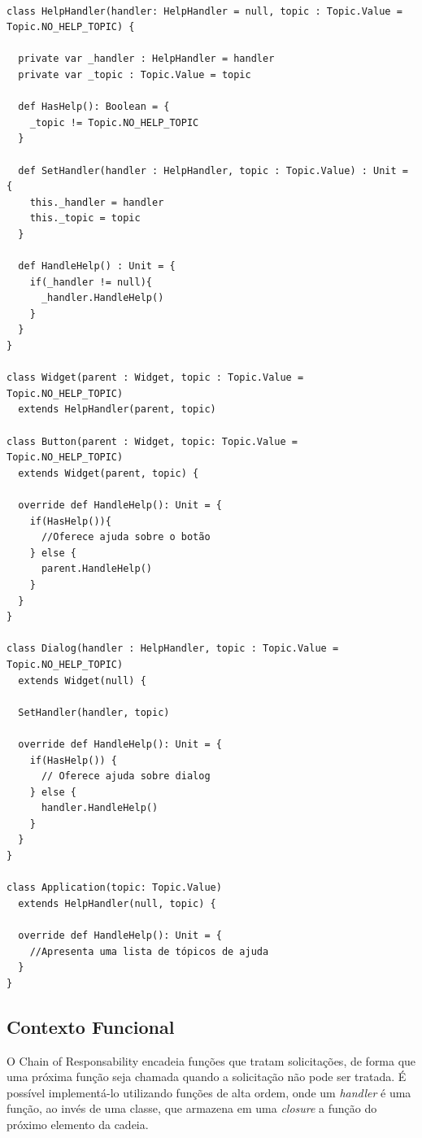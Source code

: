 \begin{lstlisting}[caption={Chain of Responsibility Orientação a Objetos.},label=oochresponsibility]

class HelpHandler(handler: HelpHandler = null, topic : Topic.Value = Topic.NO_HELP_TOPIC) {

  private var _handler : HelpHandler = handler
  private var _topic : Topic.Value = topic

  def HasHelp(): Boolean = {
    _topic != Topic.NO_HELP_TOPIC
  }

  def SetHandler(handler : HelpHandler, topic : Topic.Value) : Unit = {
    this._handler = handler
    this._topic = topic
  }

  def HandleHelp() : Unit = {
    if(_handler != null){
      _handler.HandleHelp()
    }
  }
}

class Widget(parent : Widget, topic : Topic.Value = Topic.NO_HELP_TOPIC)
  extends HelpHandler(parent, topic)
  
class Button(parent : Widget, topic: Topic.Value = Topic.NO_HELP_TOPIC)
  extends Widget(parent, topic) {

  override def HandleHelp(): Unit = {
    if(HasHelp()){
      //Oferece ajuda sobre o botão
    } else {
      parent.HandleHelp()
    }
  }
}

class Dialog(handler : HelpHandler, topic : Topic.Value = Topic.NO_HELP_TOPIC)
  extends Widget(null) {

  SetHandler(handler, topic)

  override def HandleHelp(): Unit = {
    if(HasHelp()) {
      // Oferece ajuda sobre dialog
    } else {
      handler.HandleHelp()
    }
  }
}

class Application(topic: Topic.Value)
  extends HelpHandler(null, topic) {

  override def HandleHelp(): Unit = {
    //Apresenta uma lista de tópicos de ajuda
  }
}

\end{lstlisting}

\subsection*{Contexto Funcional}

O Chain of Responsability encadeia funções que 
tratam solicitações, de forma que uma próxima 
função seja chamada quando a solicitação não 
pode ser tratada. É possível implementá-lo 
utilizando funções de alta ordem, onde um 
\textit{handler} é uma função, ao invés de 
uma classe, que armazena em uma \textit{closure} 
a função do próximo elemento da cadeia. 

